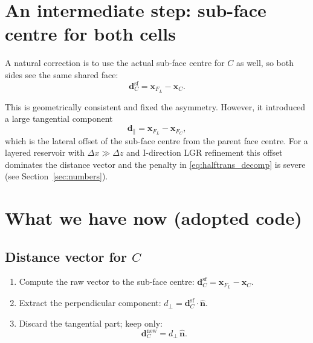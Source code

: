 \documentclass[11pt,a4paper]{article}
\begin{document}
\section{An intermediate step: sub-face centre for both cells}

A natural correction is to use the actual sub-face centre for $C$ as
well, so both sides see the same shared face:
\begin{equation}
  \mathbf{d}_C^{\text{sf}} = \mathbf{x}_{F_L} - \mathbf{x}_C.
\end{equation}

This is geometrically consistent and fixed the asymmetry.  However, it
introduced a large tangential component
\begin{equation}
  \mathbf{d}_\parallel = \mathbf{x}_{F_L} - \mathbf{x}_{F_C},
\end{equation}
which is the lateral offset of the sub-face centre from the parent face
centre.  For a layered reservoir with $\Delta x \gg \Delta z$ and
I-direction LGR refinement this offset dominates the distance vector and
the penalty in \eqref{eq:halftrans_decomp} is severe (see
Section~\ref{sec:numbers}).

\section{What we have now (adopted code)}
\label{sec:new}

\subsection*{Distance vector for $C$}

\begin{enumerate}
  \item Compute the raw vector to the sub-face centre:
        $\mathbf{d}_C^{\text{sf}} = \mathbf{x}_{F_L} - \mathbf{x}_C$.
  \item Extract the perpendicular component:
        $d_\perp = \mathbf{d}_C^{\text{sf}} \cdot \hat{\mathbf{n}}$.
  \item Discard the tangential part; keep only:
        \begin{equation}
          \boxed{\mathbf{d}_C^{\text{new}} = d_\perp\,\hat{\mathbf{n}}.}
          \label{eq:dnew}
        \end{equation}
\end{enumerate}
\end{document}
